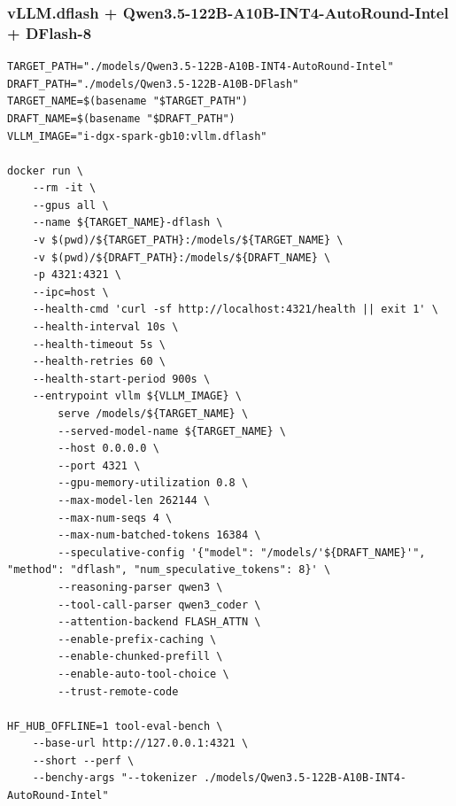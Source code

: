 \documentclass{article}
\begin{document}
\subsubsection{vLLM.dflash + Qwen3.5-122B-A10B-INT4-AutoRound-Intel + DFlash-8}
\begin{lstlisting}
TARGET_PATH="./models/Qwen3.5-122B-A10B-INT4-AutoRound-Intel"
DRAFT_PATH="./models/Qwen3.5-122B-A10B-DFlash"
TARGET_NAME=$(basename "$TARGET_PATH")
DRAFT_NAME=$(basename "$DRAFT_PATH")
VLLM_IMAGE="i-dgx-spark-gb10:vllm.dflash"

docker run \
    --rm -it \
    --gpus all \
    --name ${TARGET_NAME}-dflash \
    -v $(pwd)/${TARGET_PATH}:/models/${TARGET_NAME} \
    -v $(pwd)/${DRAFT_PATH}:/models/${DRAFT_NAME} \
    -p 4321:4321 \
    --ipc=host \
    --health-cmd 'curl -sf http://localhost:4321/health || exit 1' \
    --health-interval 10s \
    --health-timeout 5s \
    --health-retries 60 \
    --health-start-period 900s \
    --entrypoint vllm ${VLLM_IMAGE} \
        serve /models/${TARGET_NAME} \
        --served-model-name ${TARGET_NAME} \
        --host 0.0.0.0 \
        --port 4321 \
        --gpu-memory-utilization 0.8 \
        --max-model-len 262144 \
        --max-num-seqs 4 \
        --max-num-batched-tokens 16384 \
        --speculative-config '{"model": "/models/'${DRAFT_NAME}'", "method": "dflash", "num_speculative_tokens": 8}' \
        --reasoning-parser qwen3 \
        --tool-call-parser qwen3_coder \
        --attention-backend FLASH_ATTN \
        --enable-prefix-caching \
        --enable-chunked-prefill \
        --enable-auto-tool-choice \
        --trust-remote-code

HF_HUB_OFFLINE=1 tool-eval-bench \
    --base-url http://127.0.0.1:4321 \
    --short --perf \
    --benchy-args "--tokenizer ./models/Qwen3.5-122B-A10B-INT4-AutoRound-Intel"
\end{lstlisting}
\end{document}
